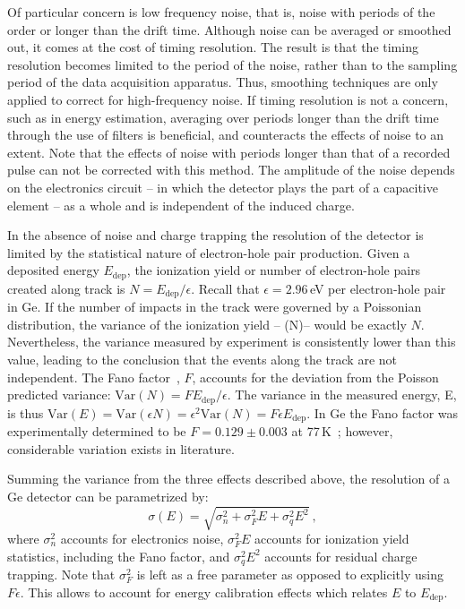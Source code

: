 Of particular concern is low frequency noise, that is, noise with periods of the order or longer than the drift time. Although noise can be averaged or smoothed out, it comes at the cost of timing resolution. The result is that the timing resolution becomes limited to the period of the noise, rather than to the sampling period of the data acquisition apparatus. Thus, smoothing techniques are only applied to correct for high-frequency noise. If timing resolution is not a concern, such as in energy estimation, averaging over periods longer than the drift time through the use of filters is beneficial, and counteracts the effects of noise to an extent. Note that the effects of noise with periods longer than that of a recorded pulse can not be corrected with this method. The amplitude of the noise depends on the electronics circuit -- in which the detector plays the part of a capacitive element -- as a whole and is independent of the induced charge.

In the absence of noise and charge trapping the resolution of the detector is limited by the statistical nature of electron-hole pair production. Given a deposited energy $E_\text{dep}$, the ionization yield or number of electron-hole pairs created along track is $N = E_\text{dep}/\epsilon$. Recall that $\epsilon = 2.96$\,eV per electron-hole pair in Ge. If the number of impacts in the track were governed by a Poissonian distribution, the variance of the ionization yield -- (N)-- would be exactly $N$. Nevertheless, the variance measured by experiment is consistently lower than this value, leading to the conclusion that the events along the track are not independent. The Fano factor~\cite{fano}, $F$, accounts for the deviation from the Poisson predicted variance: $\text{Var}(N) = FE_\text{dep}/\epsilon$. The variance in the measured energy, E, is thus $\text{Var}(E) = \text{Var}(\epsilon N) = \epsilon^2\text{Var}(N) = F\epsilon E_\text{dep}$. In Ge the Fano factor was experimentally determined to be $F = 0.129 \pm 0.003$ at 77\,K~\cite{fanoGe}; however, considerable variation exists in literature. 

Summing the variance from the three effects described above, the resolution of a Ge detector can be parametrized by:
\begin{equation}
	\sigma(E) = \sqrt{\sigma_n^2 + \sigma_F^2E + \sigma_q^2E^2}~,
	\label{eq:energy_resolution}
\end{equation}
where $\sigma_n^2$ accounts for electronics noise, $\sigma_F^2E$ accounts for ionization yield statistics, including the Fano factor, and $\sigma_q^2E^2$ accounts for residual charge trapping. Note that $\sigma_F^2$ is left as a free parameter as opposed to explicitly using $F\epsilon$. This allows to account for energy calibration effects which relates $E$ to $E_\text{dep}$. 

